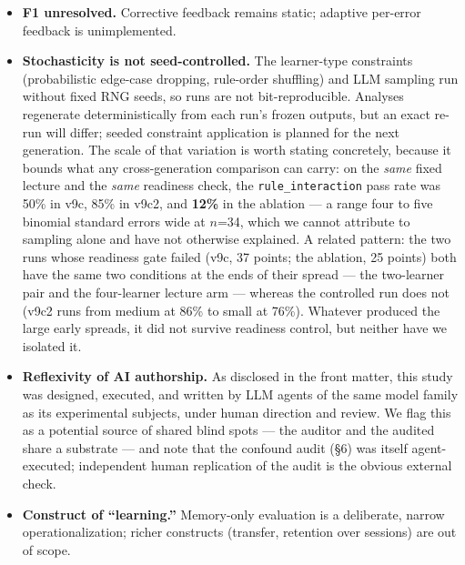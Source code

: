 \documentclass[11pt]{article}
\begin{document}
\begin{itemize}
    type --- all twelve learners, including the eight in conditions that received no
    procedure instruction, retained the correct ``check activation, then apply
    modifiers'' order in \texttt{strategy}.  The intended procedural deficit therefore
    never existed, which also explains why the run's procedure-order error detector
    reported 0\% in every condition.  Two consequences: any claim resting on a
    \emph{procedural} deficit is withdrawn (\S5.1, \S8), and v7b tested interventions
    against a deficit no learner had.  The v9c2 learner-type spread is unaffected ---
    its endpoints are \texttt{edge\_case\_dropper} (96\%) and
    \texttt{passive\_listener} (58\%), with \texttt{order\_confused} in between at
    77\% --- but the type's label overstates what was manipulated.  Operationalizing it
    properly means constraining the field where the construct actually lives.
  \item \textbf{F1 unresolved.}  Corrective feedback remains static; adaptive
    per-error feedback is unimplemented.
  \item \textbf{Stochasticity is not seed-controlled.}  The learner-type constraints
    (probabilistic edge-case dropping, rule-order shuffling) and LLM sampling run
    without fixed RNG seeds, so runs are not bit-reproducible.  Analyses regenerate
    deterministically from each run's frozen outputs, but an exact re-run will
    differ; seeded constraint application is planned for the next generation.
    The scale of that variation is worth stating concretely, because it bounds what
    any cross-generation comparison can carry: on the \emph{same} fixed lecture and
    the \emph{same} readiness check, the \texttt{rule\_interaction} pass rate was
    50\% in v9c, 85\% in v9c2, and \textbf{12\%} in the ablation --- a range four to
    five binomial standard errors wide at $n$=34, which we cannot attribute to
    sampling alone and have not otherwise explained.  A related pattern: the two runs
    whose readiness gate failed (v9c, 37 points; the ablation, 25 points) both have
    the same two conditions at the ends of their spread --- the two-learner pair and
    the four-learner lecture arm --- whereas the controlled run does not (v9c2 runs
    from medium at 86\% to small at 76\%).  Whatever produced the large early
    spreads, it did not survive readiness control, but neither have we isolated it.
  \item \textbf{Reflexivity of AI authorship.}  As disclosed in the front matter,
    this study was designed, executed, and written by LLM agents of the same model
    family as its experimental subjects, under human direction and review.  We flag
    this as a potential source of shared blind spots --- the auditor and the audited
    share a substrate --- and note that the confound audit (\S6) was itself
    agent-executed; independent human replication of the audit is the obvious
    external check.
  \item \textbf{Construct of ``learning.''}  Memory-only evaluation is a deliberate,
    narrow operationalization; richer constructs (transfer, retention over sessions)
    are out of scope.
\end{itemize}
\end{document}
